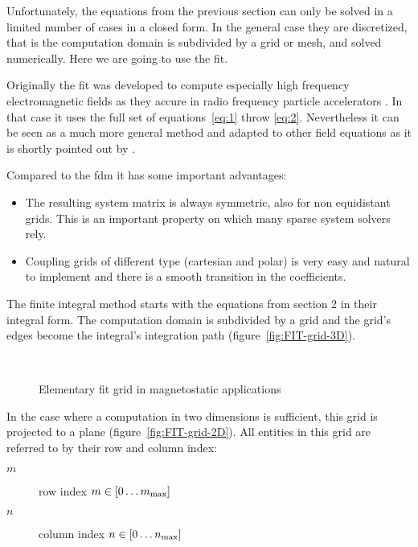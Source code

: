 Unfortunately, the equations from the previous section can only be
solved in a limited number of cases in a closed form.  In the general
case they are discretized, that is the computation domain is
subdivided by a grid or mesh, and solved numerically. Here we are
going to use the \gls{fit}. \par
Originally the \gls{fit} was developed to compute especially high
frequency electromagnetic fields as they accure in radio frequency
particle accelerators \parencite{Weiland:1977}.  In that case it uses
the full set of equations~\eqref{eq:1} throw \eqref{eq:2}.
Nevertheless it can be seen as a much more general method and adapted
to other field equations as it is shortly pointed out by \cite[section
3.4.2]{vanRienen:2010}. \par
Compared to the \gls{fdm} it has some important advantages:
\begin{itemize}
\item The resulting system matrix is always symmetric, also for non
  equidistant grids.  This is an important property on which many
  sparse system solvers rely.
\item Coupling grids of different type (cartesian and polar) is very
  easy and natural to implement and there is a smooth transition in
  the coefficients.
\end{itemize}
\par
The finite integral method starts with the equations from section 2 in
their integral form. The computation domain is subdivided by a grid
and the grid’s edges become the integral’s integration path
(figure~\ref{fig:FIT-grid-3D}).
\begin{figure}
  \centering
   {
  }
  \\ \bigskip
   {
  }
  \caption{Elementary \gls{fit} grid in magnetostatic applications}
\end{figure}
In the case where a computation in two dimensions is sufficient, this
grid is projected to a plane (figure~\ref{fig:FIT-grid-2D}).
All entities in this grid are referred to by their row and column index:
\begin{description}
\item[$m$] row index $m\in\left[0\dots m_{\text{max}}\right]$
\item[$n$] column index $n\in\left[0\dots n_{\text{max}}\right]$
\end{description}
